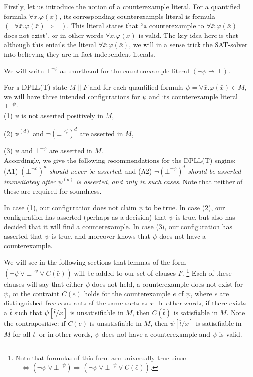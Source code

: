 \documentclass{llncs}
\begin{document}
Firstly, let us introduce the notion of a counterexample literal.
For a quantified formula $\forall \bar{ x }. \varphi( \bar{ x } )$, its corresponding counterexample literal is formula $(\neg \forall \bar{ x }. \varphi( \bar{ x } ) \Rightarrow \bot)$.
This literal states that ``a counterexample to $\forall \bar{ x }. \varphi( \bar{ x } )$ does not exist", or in other words $\forall \bar{ x }. \varphi( \bar{ x } )$ is valid.
The key idea here is that although this entails the literal $\forall \bar{ x }. \varphi( \bar{ x } )$, we will in a sense trick the SAT-solver into believing they are in fact independent literals.

We will write $\bot^{\neg \psi}$ as shorthand for the counterexample literal $(\neg \psi \Rightarrow \bot)$.

For a DPLL(T) state $M \parallel F$ and for each quantified formula $\psi = \forall \bar{ x }. \varphi( \bar{ x } ) \in M$, we will have three intended configurations for $\psi$ and its counterexample literal $\bot^{\neg \psi}$: \\

(1) $\psi$ is not asserted positively in $M$, 

(2) $\psi^{(d)}$ and $\neg (\bot^{\neg \psi})^d$ are asserted in $M$, 

(3) $\psi$ and $\bot^{\neg \psi}$ are asserted in $M$. \\

Accordingly, we give the following recommendations for the DPLL(T) engine: (A1) \emph{$(\bot^{\neg \psi})^d$ should never be asserted}, and (A2) \emph{ $\neg (\bot^{\neg \psi})^d$ should be asserted immediately after $\psi^{(d)}$ is asserted, and only in such cases}.
Note that neither of these are required for soundness.

In case (1), our configuration does not claim $\psi$ to be true.
In case (2), our configuration has asserted (perhaps as a decision) that $\psi$ is true, but also has decided that it will find a counterexample.
In case (3), our configuration has asserted that $\psi$ is true, and moreover knows that $\psi$ does not have a counterexample.

We will see in the following sections that lemmas of the form $( \neg \psi \vee \bot^{\neg \psi} \vee C(\bar{e}))$ will be added to our set of clauses $F$.
\footnote{ Note that formulas of this form are universally true since $\top \Leftrightarrow ( \neg \psi \vee \bot^{\neg \psi}) \Rightarrow ( \neg \psi \vee \bot^{\neg \psi} \vee C(\bar{e}))$. }
Each of these clauses will say that either $\psi$ does not hold, a counterexample does not exist for $\psi$, or the contraint $C(\bar{e})$ holds for the counterexample $\bar{e}$ of $\psi$,  where $\bar{e}$ are distinguished free constants of the same sorts as $\bar{x}$.
In other words, if there exists a $\bar{t}$ such that $\psi[\bar{t}/\bar{x}]$ is unsatisifiable in $M$, then $C( \bar{t})$ is satisfiable in $M$.
Note the contrapositive: if $C( \bar{e} )$ is unsatisfiable in $M$, then $\psi[\bar{t}/\bar{x}]$ is satisifiable in $M$ for all $\bar{t}$, or in other words, $\psi$ does not have a counterexample and $\psi$ is valid.
\end{document}
